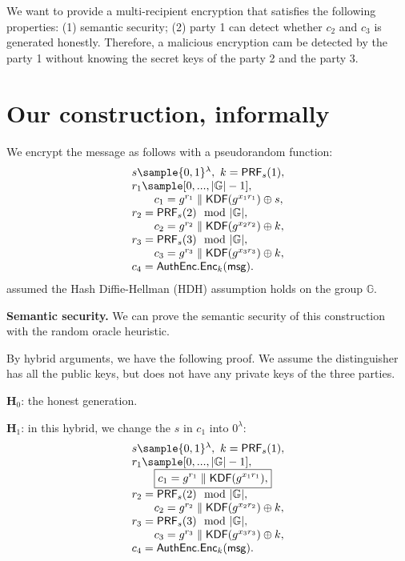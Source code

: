 \documentclass{article}
\begin{document}
We want to provide a multi-recipient encryption that satisfies the following properties: (1) semantic security; (2) party 1 can detect whether $c_2$ and $c_3$ is generated honestly. Therefore, a malicious encryption cam be detected by the party 1 without knowing the secret keys of the party 2 and the party 3.

\section{Our construction, informally}
We encrypt the message as follows with a pseudorandom function:
\[
\begin{array}{l}
s\sample\{0,1\}^\lambda,~k=\mathsf{PRF}_s(1),\\
r_1\sample[0,...,|\mathbb{G}|-1],\\
\qquad c_1=g^{r_1}\parallel\mathsf{KDF}(g^{x_1r_1})\oplus s,\\
r_2=\mathsf{PRF}_s(2)\mod{|\mathbb{G}|},\\
\qquad c_2=g^{r_2}\parallel\mathsf{KDF}(g^{x_2r_2})\oplus k,\\
r_3=\mathsf{PRF}_s(3)\mod{|\mathbb{G}|},\\
\qquad c_3=g^{r_3}\parallel\mathsf{KDF}(g^{x_3r_3})\oplus k,\\
c_4=\mathsf{AuthEnc}.\mathsf{Enc}_k(\mathsf{msg}).
\end{array}
\]
assumed the Hash Diffie-Hellman (HDH) assumption holds on the group $\mathbb{G}$. 

\smallskip
\noindent\textbf{Semantic security.} We can prove the semantic security of this construction with the random oracle heuristic. 

By hybrid arguments, we have the following proof. We assume the distinguisher has all the public keys, but does not have any private keys of the three parties.

\smallskip
\noindent $\mathbf{H}_0$: the honest generation.

\smallskip
\noindent $\mathbf{H}_1$: in this hybrid, we change the $s$ in $c_1$ into $0^\lambda$:
\[
\begin{array}{l}
s\sample\{0,1\}^\lambda,~k=\mathsf{PRF}_s(1),\\
r_1\sample[0,...,|\mathbb{G}|-1],\\
\qquad \boxed{c_1=g^{r_1}\parallel\mathsf{KDF}(g^{x_1r_1}),}\\
r_2=\mathsf{PRF}_s(2)\mod{|\mathbb{G}|},\\
\qquad c_2=g^{r_2}\parallel\mathsf{KDF}(g^{x_2r_2})\oplus k,\\
r_3=\mathsf{PRF}_s(3)\mod{|\mathbb{G}|},\\
\qquad c_3=g^{r_3}\parallel\mathsf{KDF}(g^{x_3r_3})\oplus k,\\
c_4=\mathsf{AuthEnc}.\mathsf{Enc}_k(\mathsf{msg}).
\end{array}
\]
\end{document}

